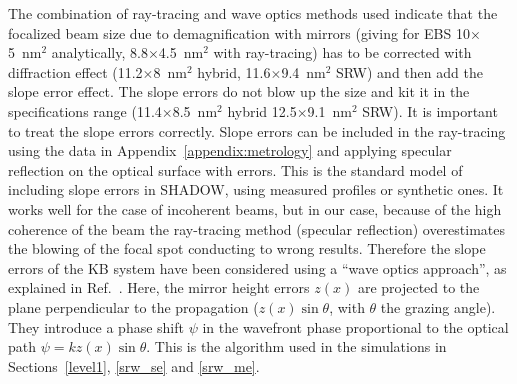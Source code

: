 \documentclass{iucr}              %
\begin{document}
The combination of ray-tracing and wave optics methods used indicate that the focalized beam size due to  demagnification with mirrors (giving for EBS 10$\times$5~nm$^2$ analytically, 8.8$\times$4.5~nm$^2$ with ray-tracing) has to be corrected with diffraction effect (11.2$\times$8~nm$^2$ hybrid, 11.6$\times$9.4~nm$^2$ SRW) and then add the slope error effect. The slope errors do not blow up the size and kit it in the specifications range (11.4$\times$8.5~nm$^2$ hybrid 12.5$\times$9.1~nm$^2$ SRW). It is important to treat the slope errors correctly. Slope errors can be included in the ray-tracing using the data in Appendix~\ref{appendix:metrology} and applying specular reflection on the optical surface with errors. This is the standard model of including slope errors in SHADOW, using measured profiles or synthetic ones. It works well for the case of incoherent beams, but in our case, because of the high coherence of the beam the ray-tracing method (specular reflection) overestimates the blowing of the focal spot conducting to wrong results. Therefore the slope errors of the KB system have been considered using a ``wave optics approach'', as explained in Ref.~\cite{hybrid}. Here, the mirror height errors $z(x)$ are projected to the plane perpendicular to the propagation ($z(x) \sin \theta$, with $\theta$ the grazing angle). They introduce a phase shift $\psi$ in the wavefront phase proportional to the optical path $\psi = k z(x) \sin \theta $. This is the algorithm used in the simulations in Sections~\ref{level1}, \ref{srw_se} and \ref{srw_me}.   


\end{document}
